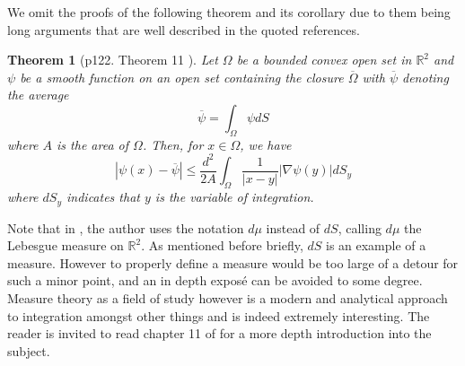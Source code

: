 \documentclass[11pt]{report}
\newtheorem{thm}{Theorem}[section]
\theoremstyle{definition}
\begin{document}
We omit the proofs of the following theorem and its corollary due to them being long arguments that are well described in the quoted references.
\begin{thm}[p122. Theorem 11 \cite{donaldson}]\label{quotedTheorem11}
  Let $\Omega$ be a bounded convex open set in $\mathbb{R}^2$ and $\psi$ be a smooth function on an open set containing the closure $\overline{\Omega}$ with $\overline{\psi}$ denoting the average 
  \[\overline{\psi} = \int_{\Omega}\psi dS\] 
  where $A$ is the area of $\Omega$. Then, for $x \in \Omega$, we have 
  \[|\psi(x) - \overline{\psi}| \leq \frac{d^2}{2A}\int_\Omega \frac{1}{|x - y|}|\nabla\psi(y)|dS_y\] where $dS_y$ indicates that $y$ is the variable of integration.
\end{thm}
Note that in \cite{donaldson}, the author uses the notation $d\mu$ instead of $dS$, calling $d\mu$ the Lebesgue measure on $\mathbb{R}^2$. As mentioned before briefly, $dS$ is an example of a measure. However to properly define a measure would be too large of a detour for such a minor point, and an in depth expos\'{e} can be avoided to some degree. Measure theory as a field of study however is a modern and analytical approach to integration amongst other things and is indeed extremely interesting. The reader is invited to read chapter 11 of \cite{babyRudin} for a more depth introduction into the subject.
\end{document}
